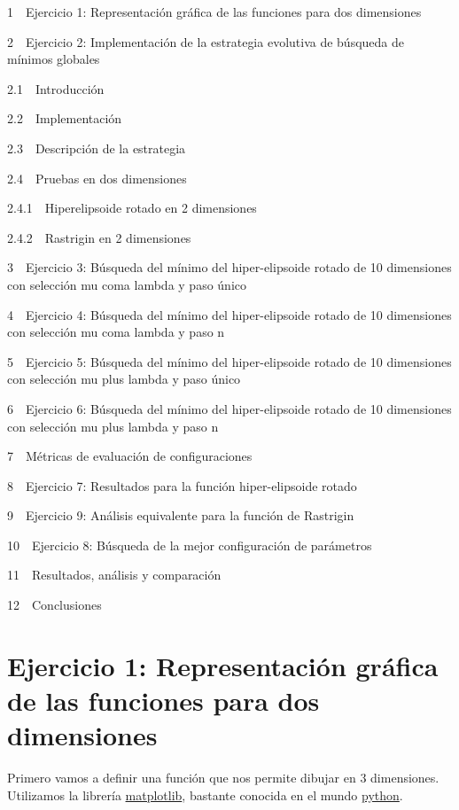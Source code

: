 \documentclass[11pt]{article}
\begin{document}
{1~~}Ejercicio 1: Representación gráfica de las funciones para dos
dimensiones

{2~~}Ejercicio 2: Implementación de la estrategia evolutiva de búsqueda
de mínimos globales

{2.1~~}Introducción

{2.2~~}Implementación

{2.3~~}Descripción de la estrategia

{2.4~~}Pruebas en dos dimensiones

{2.4.1~~}Hiperelipsoide rotado en 2 dimensiones

{2.4.2~~}Rastrigin en 2 dimensiones

{3~~}Ejercicio 3: Búsqueda del mínimo del hiper-elipsoide rotado de 10
dimensiones con selección mu coma lambda y paso único

{4~~}Ejercicio 4: Búsqueda del mínimo del hiper-elipsoide rotado de 10
dimensiones con selección mu coma lambda y paso n

{5~~}Ejercicio 5: Búsqueda del mínimo del hiper-elipsoide rotado de 10
dimensiones con selección mu plus lambda y paso único

{6~~}Ejercicio 6: Búsqueda del mínimo del hiper-elipsoide rotado de 10
dimensiones con selección mu plus lambda y paso n

{7~~}Métricas de evaluación de configuraciones

{8~~}Ejercicio 7: Resultados para la función hiper-elipsoide rotado

{9~~}Ejercicio 9: Análisis equivalente para la función de Rastrigin

{10~~}Ejercicio 8: Búsqueda de la mejor configuración de parámetros

{11~~}Resultados, análisis y comparación

{12~~}Conclusiones

    \section{Ejercicio 1: Representación gráfica de las funciones para dos
dimensiones}\label{ejercicio-1-representaciuxf3n-gruxe1fica-de-las-funciones-para-dos-dimensiones}

Primero vamos a definir una función que nos permite dibujar en 3
dimensiones. Utilizamos la librería
\href{http://matplotlib.org/}{matplotlib}, bastante conocida en el mundo
\href{https://www.python.org/}{python}.
\end{document}
